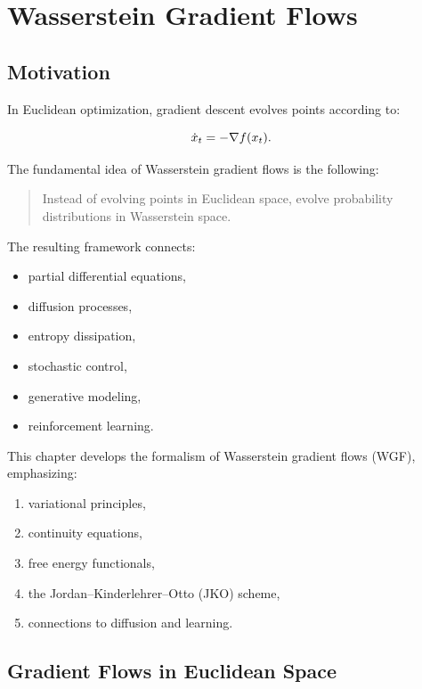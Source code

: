 
\chapter{Wasserstein Gradient Flows}
\section{Motivation}

In Euclidean optimization, gradient descent evolves points according to:

\[
\dot x_t = -\nabla f(x_t).
\]

The fundamental idea of Wasserstein gradient flows is the following:

\begin{quote}
Instead of evolving points in Euclidean space, evolve probability distributions in Wasserstein space.
\end{quote}

The resulting framework connects:

\begin{itemize}
    \item partial differential equations,
    \item diffusion processes,
    \item entropy dissipation,
    \item stochastic control,
    \item generative modeling,
    \item reinforcement learning.
\end{itemize}

This chapter develops the formalism of Wasserstein gradient flows (WGF), emphasizing:

\begin{enumerate}[label=(\roman*)]
    \item variational principles,
    \item continuity equations,
    \item free energy functionals,
    \item the Jordan--Kinderlehrer--Otto (JKO) scheme,
    \item connections to diffusion and learning.
\end{enumerate}

\section{Gradient Flows in Euclidean Space}

